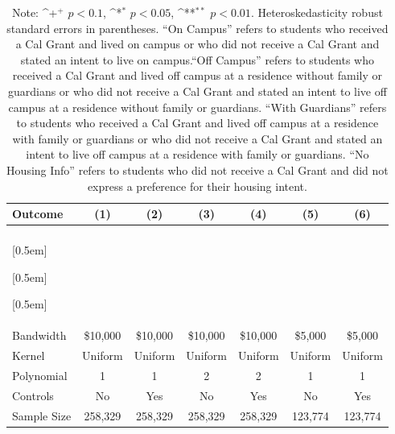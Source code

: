 \documentclass[12pt,letterpaper,oneside]{book}
\newcommand{\basepath}{g:/My Drive/Grad School}
\newcommand{\basepath}{basepath}
\begin{document}
    \begin{table}[h!]\centering
    \def\sym#1{\ifmmode^{#1}\else\(^{#1}\)\fi}
    \caption{Estimated Impacts of 2017-2019 Cal Grant Receipt on Student Housing Choice\label{tab:housing1}}
    \begin{tabular}{l*{6}{c}}
        \hline\hline
        Outcome&\multicolumn{1}{c}{(1)}&\multicolumn{1}{c}{(2)}&\multicolumn{1}{c}{(3)}&\multicolumn{1}{c}{(4)}&\multicolumn{1}{c}{(5)}&\multicolumn{1}{c}{(6)}\\
        \hline
        &&&&&&\\

         [0.5em]

         [0.5em]

         [0.5em]

        

        &&&&&&\\

        \hline
        Bandwidth & \$10,000       &   \$10,000        &   \$10,000        &   \$10,000       &   \$5,000        &   \$5,000        \\
        Kernel&   Uniform      &   Uniform        &   Uniform        &   Uniform       &   Uniform       &   Uniform       \\
        Polynomial&   1       &   1        &   2        &   2       &   1       &   1       \\
        Controls&   No       &   Yes        &   No        &   Yes        &   No        &   Yes        \\
        Sample Size      &   258,329     &    258,329      &      258,329      &   258,329    &   123,774       &   123,774        \\
        \hline
    \end{tabular}
    \caption*{\footnotesize Note: \sym{+} \(p<0.1\), \sym{*} \(p<0.05\), \sym{**} \(p<0.01\). Heteroskedasticity robust standard errors in parentheses. ``On Campus'' refers to students who received a Cal Grant and lived on campus or who did not receive a Cal Grant and stated an intent to live on campus.``Off Campus'' refers to students who received a Cal Grant and lived off campus at a residence without family or guardians or who did not receive a Cal Grant and stated an intent to live off campus at a residence without family or guardians. ``With Guardians'' refers to students who received a Cal Grant and lived off campus at a residence with family or guardians or who did not receive a Cal Grant and stated an intent to live off campus at a residence with family or guardians.  ``No Housing Info'' refers to students who did not receive a Cal Grant and did not express a preference for their housing intent.}
\end{table}
\end{document}
